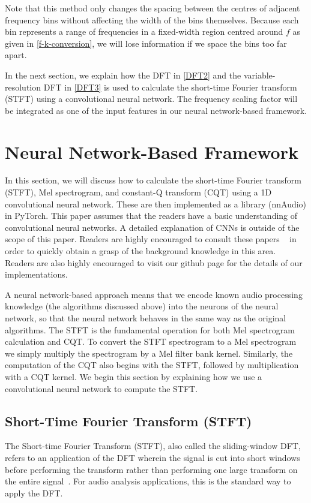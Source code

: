 \documentclass{ieeeaccess}
\begin{document}
Note that this method only changes the spacing between the centres of adjacent frequency bins without affecting the width of the bins themselves. Because each bin represents a range of frequencies in a fixed-width region centred around $f$ as given in \eqref{f-k-conversion}, we will lose information if we space the bins too far apart.  


In the next section, we explain how the DFT in \eqref{DFT2} and the variable-resolution DFT in \eqref{DFT3} is used to calculate the short-time Fourier transform (STFT) using a convolutional neural network. The frequency scaling factor will be integrated as one of the input features in our neural network-based framework.



\section{Neural Network-Based Framework} \label{sec: PyTorch}
In this section, we will discuss how to calculate the short-time Fourier transform (STFT), Mel spectrogram, and constant-Q transform (CQT) using a 1D convolutional neural network. These are then  implemented as a library (nnAudio) in PyTorch\footnotemark[2]. {This paper assumes that the readers have a basic understanding of convolutional neural networks. {A detailed explanation of CNNs is outside of the scope of this paper. Readers are highly encouraged to consult these papers ~\cite{lecun1995convolutional,lecun1998gradient} in order to quickly obtain a grasp of the background knowledge in this area. Readers are also highly encouraged to visit our github page for the details of our implementations\footnotemark[2]}.}

{A neural network-based approach means that we encode known audio processing knowledge (the algorithms discussed above) into the neurons of the neural network, so that the neural network behaves in the same way as the original algorithms.} The STFT is the fundamental operation for both Mel spectrogram calculation and CQT. To convert the STFT spectrogram to a Mel spectrogram we simply multiply the spectrogram by a Mel filter bank kernel. Similarly, the computation of the CQT also begins with the STFT, followed by multiplication with a CQT kernel. We begin this section by explaining how we use a convolutional neural network to compute the STFT.



\subsection{Short-Time Fourier Transform (STFT)} \label{subsec:STFT}
The Short-time Fourier Transform (STFT), also called the sliding-window DFT, refers to an application of the DFT wherein the signal is cut into short windows before performing the transform rather than performing one large transform on the entire signal~\cite{Nawab:1987:SFT:42739.42745}. For audio analysis applications, this is the standard way to apply the DFT.
\end{document}

